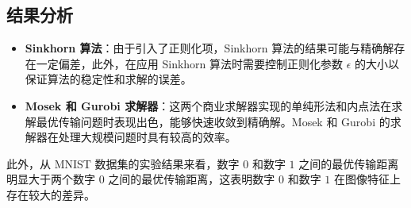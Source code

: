 \documentclass{article}
\begin{document}
\subsection{结果分析}
\begin{itemize}
    \item \textbf{Sinkhorn 算法}：由于引入了正则化项，Sinkhorn 算法的结果可能与精确解存在一定偏差，此外，在应用 Sinkhorn 算法时需要控制正则化参数 $\epsilon$ 的大小以保证算法的稳定性和求解的误差。
    \item \textbf{Mosek 和 Gurobi 求解器}：这两个商业求解器实现的单纯形法和内点法在求解最优传输问题时表现出色，能够快速收敛到精确解。Mosek 和 Gurobi 的求解器在处理大规模问题时具有较高的效率。
\end{itemize}

此外，从 MNIST 数据集的实验结果来看，数字 $0$ 和数字 $1$ 之间的最优传输距离明显大于两个数字 $0$ 之间的最优传输距离，这表明数字 $0$ 和数字 $1$ 在图像特征上存在较大的差异。
\end{document}
